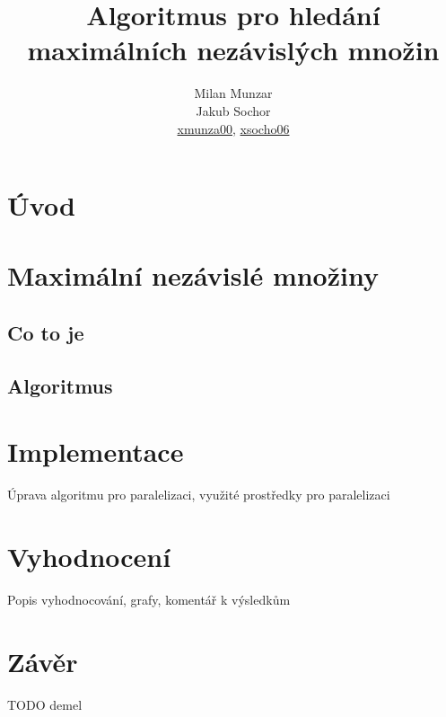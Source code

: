 \documentclass[12pt]{article}
\title{Algoritmus pro hledání maximálních nezávislých množin}
\author{Milan Munzar\\
Jakub Sochor\\
\normalsize{\url{xmunza00}, \url{xsocho06} }}
\date{}
\begin{document}
\maketitle

\section{Úvod}

\section{Maximální nezávislé množiny}
\subsection{Co to je}
\subsection{Algoritmus}


\section{Implementace}
Úprava algoritmu pro paralelizaci, využité prostředky pro paralelizaci


\section{Vyhodnocení}
Popis vyhodnocování, grafy, komentář k výsledkům

\section{Závěr}

\begin{thebibliography}{99}
 TODO demel
\end{thebibliography}
\end{document}
